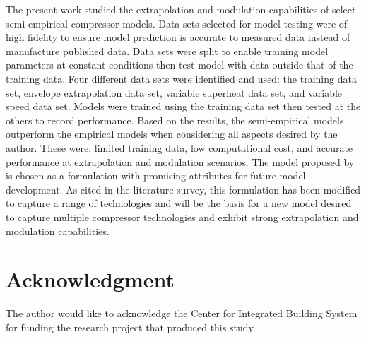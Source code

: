 \documentclass[preprint,11pt,authoryear]{elsarticle}
\begin{document}
The present work studied the extrapolation and modulation capabilities of select semi-empirical compressor models. Data sets selected for model testing were of high fidelity to ensure model prediction is accurate to measured data instead of manufacture published data. Data sets were split to enable training model parameters at constant conditions then test model with data outside that of the training data. Four different data sets were identified and used: the training data set, envelope extrapolation data set, variable superheat data set, and variable speed data set. Models were trained using the training data set then tested at the others to record performance. Based on the results, the semi-empirical models outperform the empirical models when considering all aspects desired by the author. These were: limited training data, low computational cost, and accurate performance at extrapolation and modulation scenarios. The model proposed by \cite{Winandy_recip} is chosen as a formulation with promising attributes for future model development. As cited in the literature survey, this formulation has been modified to capture a range of technologies and will be the basis for a new model desired to capture multiple compressor technologies and exhibit strong extrapolation and modulation capabilities.

\section{Acknowledgment}
The author would like to acknowledge the Center for Integrated Building System for funding the research project that produced this study.

\newpage
\FloatBarrier




\newpage
\appendix
\end{document}

